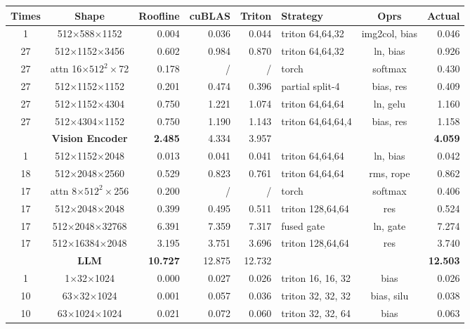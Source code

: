 
\begin{table}
\centering
\begin{tabular}{cc>{\columncolor{gray!20}}r|rrl|c>{\columncolor{gray!20}}r}
\textbf{Times} & \textbf{Shape} & \textbf{Roofline} & \textbf{cuBLAS} & \textbf{Triton} & \textbf{Strategy} & \textbf{Oprs} & \textbf{Actual}\\
\hline
1 & 512$\times$588$\times$1152 & 0.004 & 0.036 & 0.044 & triton 64,64,32 & img2col, bias & 0.046\\
27 & 512$\times$1152$\times$3456 & 0.602 & 0.984 & 0.870 & triton 64,64,32 & ln, bias & 0.926\\
27 & attn 16$\times 512^2 \times$72 & 0.178 & / & / & torch & softmax & 0.430\\
27 & 512$\times$1152$\times$1152 & 0.201 & 0.474 & 0.396 & partial split-4 & bias, res & 0.409\\
27 & 512$\times$1152$\times$4304 & 0.750 & 1.221 & 1.074 & triton 64,64,64 & ln, gelu & 1.160\\
27 & 512$\times$4304$\times$1152 & 0.750 & 1.190 & 1.143 & triton 64,64,64,4 & bias, res & 1.158\\
\hline
 & \textbf{Vision Encoder} & \textbf{2.485} & 4.334 & 3.957 &  &  & \textbf{4.059}\\
\hline
1 & 512$\times$1152$\times$2048 & 0.013 & 0.041 & 0.041 & triton 64,64,64 & ln, bias & 0.042\\
18 & 512$\times$2048$\times$2560 & 0.529 & 0.823 & 0.761 & triton 64,64,64 & rms, rope & 0.862\\
17 & attn 8$\times 512^2 \times$256 & 0.200 & / & / & torch & softmax & 0.406\\
17 & 512$\times$2048$\times$2048 & 0.399 & 0.495 & 0.511 & triton 128,64,64 & res & 0.524\\
17 & 512$\times$2048$\times$32768 & 6.391 & 7.359 & 7.317 & fused gate & ln, gate & 7.274\\
17 & 512$\times$16384$\times$2048 & 3.195 & 3.751 & 3.696 & triton 128,64,64 & res & 3.740\\
\hline
 & \textbf{LLM} & \textbf{10.727} & 12.875 & 12.732 &  &  & \textbf{12.503}\\
\hline
1 & 1$\times$32$\times$1024 & 0.000 & 0.027 & 0.026 & triton 16, 16, 32 & bias & 0.026\\
10 & 63$\times$32$\times$1024 & 0.001 & 0.057 & 0.036 & triton 32, 32, 32 & bias, silu & 0.038\\
10 & 63$\times$1024$\times$1024 & 0.021 & 0.072 & 0.060 & triton 32, 32, 64 & bias & 0.063\\

\end{tabular}
\end{table}
